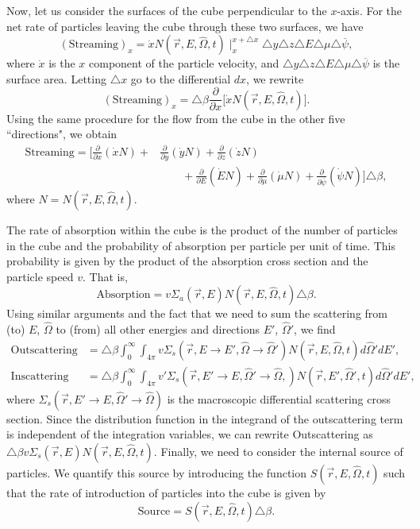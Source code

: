 \documentclass[12pt]{article}
\newcommand{\rvec}{\ensuremath{\vec{r}}}
\newcommand{\omvec}{\ensuremath{\hat{\Omega}}}
\begin{document}
 Now, let us consider the surfaces of the cube perpendicular to the $x$-axis. For the net rate
of particles leaving the cube through these two surfaces, we have
\begin{equation*}
(\textrm{Streaming})_x = \dot x N(\rvec,E,\omvec,t)\mid_x^{x+\triangle x}
\triangle y\triangle z\triangle E\triangle \mu\triangle \overline\psi,
\end{equation*}
 where $\dot x$ is the $x$ component of the particle velocity,
and 
$\triangle y\triangle z\triangle E\triangle\mu\triangle \overline\psi$ is the surface area. Letting $\triangle x$ go to
the differential $dx$, we rewrite
\begin{equation*}
(\textrm{Streaming})_x = \triangle \beta \frac{\partial}{\partial x}\big[
\dot x N(\rvec,E,\omvec,t)\big].
\end{equation*}
 Using the same procedure for the flow from the cube in the other five ``directions", we obtain
\begin{align*}
\textrm{Streaming} =
\bigg[ \frac{\partial}{\partial x}(\dot x N) + &
\frac{\partial}{\partial y}(\dot y N) +\frac{\partial}{\partial z}(\dot z N) \\
&\quad\quad + \frac{\partial}{\partial E}(\dot E N) + \frac{\partial}{\partial \mu}(\dot \mu N) +
\frac{\partial}{\partial \overline{\psi}}(\dot \psi N)\bigg] \triangle \beta,
\end{align*}
 where $N = N(\rvec,E,\omvec,t)$.


 The rate of absorption within the cube is the product of the number of particles in the cube
and the probability of absorption per particle per unit of time. This probability is given by
the product of the absorption cross section and the particle speed $v$. That is,
\begin{equation*}
\textrm{Absorption} = v\Sigma_a(\rvec,E)N(\rvec ,E,\omvec,t)\triangle \beta.
\end{equation*}
 Using similar arguments and the fact that we need to sum the scattering from (to) $E$,
$\omvec$ to (from) all other energies and directions $E'$, $\omvec'$, we find
\begin{align*}
\textrm{Outscattering} &= \triangle \beta \int_0^{\infty}\int_{4\pi}
v\Sigma_s(\rvec,E\rightarrow E', \omvec\rightarrow\omvec')N(\rvec,E,\omvec,t)d\omvec'dE', \\
\textrm{Inscattering} &= \triangle \beta \int_0^{\infty}\int_{4\pi}
v'\Sigma_s(\rvec,E'\rightarrow E, \omvec'\rightarrow\omvec,)N(\rvec,E',\omvec',t)d\omvec'dE',
\end{align*}
 where $\Sigma_s(\rvec,E'\rightarrow E, \omvec'\rightarrow\omvec)$ is the macroscopic differential scattering cross section. Since the distribution function in the integrand of the outscattering term is independent of
 the integration variables, we can rewrite
Outscattering as $\triangle \beta v\Sigma_s(\rvec,E)N(\rvec, E, \omvec,t).$
Finally, we need to consider the internal source of particles. We
quantify this source  by introducing the function $S(\rvec, E, \omvec, t)$
such that the rate of introduction of particles into the cube is given by
\begin{equation*}
\textrm{Source} = S(\rvec,E,\omvec,t)\triangle \beta.
\end{equation*}
\end{document}
